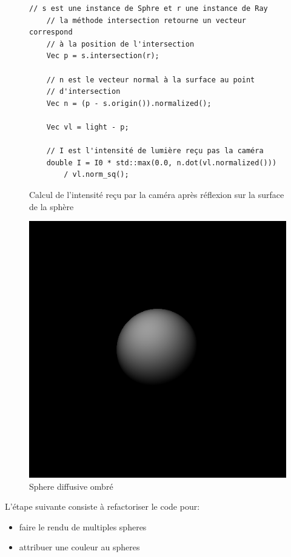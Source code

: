 \documentclass[12pt]{article}
\begin{document}
\begin{figure}[ht]
  \begin{lstlisting}[frame=single]
    // s est une instance de Sphre et r une instance de Ray
    // la méthode intersection retourne un vecteur correspond
    // à la position de l'intersection
    Vec p = s.intersection(r);

    // n est le vecteur normal à la surface au point
    // d'intersection
    Vec n = (p - s.origin()).normalized();

    Vec vl = light - p;

    // I est l'intensité de lumière reçu pas la caméra
    double I = I0 * std::max(0.0, n.dot(vl.normalized()))
        / vl.norm_sq();
  \end{lstlisting}
  \caption{Calcul de l'intensité reçu par la caméra après réflexion sur la surface de la sphère}\label{code:platre}
\end{figure}

\begin{figure}[ht]
  \centering
  \includegraphics[width=12cm]{../result/step2}
  \caption{Sphere diffusive ombré}\label{fig:step2}
\end{figure}

L'étape suivante consiste à refactoriser le code pour:
\begin{itemize}
  \item faire le rendu de multiples spheres
  \item attribuer une couleur au spheres
\end{itemize}
\end{document}
